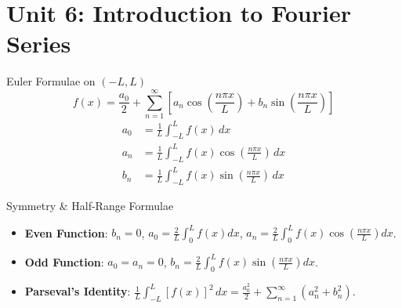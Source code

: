 \chapter{Unit 6: Introduction to Fourier Series}

\begin{formulabox}{Euler Formulae on $(-L, L)$}
\begin{equation}
f(x) = \frac{a_0}{2} + \sum_{n=1}^\infty \left[ a_n \cos\left(\frac{n\pi x}{L}\right) + b_n \sin\left(\frac{n\pi x}{L}\right) \right]
\end{equation}
\begin{align}
a_0 &= \frac{1}{L} \int_{-L}^L f(x)\,dx \\
a_n &= \frac{1}{L} \int_{-L}^L f(x)\cos\left(\frac{n\pi x}{L}\right)\,dx \\
b_n &= \frac{1}{L} \int_{-L}^L f(x)\sin\left(\frac{n\pi x}{L}\right)\,dx
\end{align}
\end{formulabox}

\begin{formulabox}{Symmetry \& Half-Range Formulae}
\begin{itemize}[leftmargin=1.5em]
    \item \textbf{Even Function}: $b_n = 0$, $a_0 = \frac{2}{L}\int_0^L f(x)dx$, $a_n = \frac{2}{L}\int_0^L f(x)\cos(\frac{n\pi x}{L})dx$.
    \item \textbf{Odd Function}: $a_0 = a_n = 0$, $b_n = \frac{2}{L}\int_0^L f(x)\sin(\frac{n\pi x}{L})dx$.
    \item \textbf{Parseval's Identity}: $\frac{1}{L} \int_{-L}^L [f(x)]^2\,dx = \frac{a_0^2}{2} + \sum_{n=1}^\infty (a_n^2 + b_n^2)$.
\end{itemize}
\end{formulabox}
